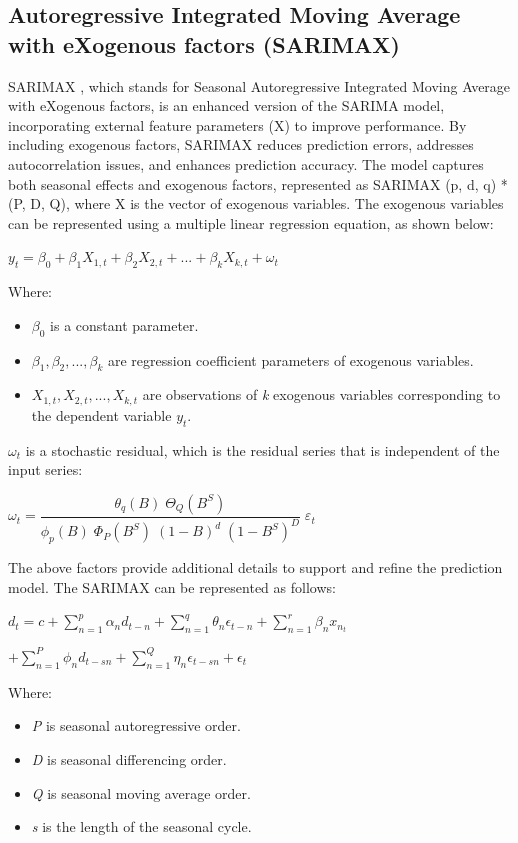 \documentclass{ieeeojies}
\begin{document}
\subsection{Autoregressive Integrated Moving Average with eXogenous factors (SARIMAX)}
SARIMAX \cite{b8}, which stands for Seasonal Autoregressive Integrated Moving Average with eXogenous factors, is an enhanced version of the SARIMA model, incorporating external feature parameters (X) to improve performance. By including exogenous factors, SARIMAX reduces prediction errors, addresses autocorrelation issues, and enhances prediction accuracy. The model captures both seasonal effects and exogenous factors, represented as SARIMAX (p, d, q) * (P, D, Q), where X is the vector of exogenous variables. The exogenous variables can be represented using a multiple linear regression equation, as shown below:
\newline  \centerline{$y_{t} = \beta_{0} + \beta_{1}X_{1,t} + \beta_{2}X_{2,t} + ... + \beta_{k}X_{k,t} + \omega_{t}$}
\newline Where:
\begin{itemize}
	\item $\beta_{0}$ is a constant parameter.
	\item $\beta_{1}, \beta_{2}, ..., \beta_{k}$ are regression coefficient parameters of exogenous variables.
	\item $X_{1,t}, X_{2,t}, ..., X_{k,t}$ are observations
	of \textit{k} exogenous variables corresponding to the dependent variable $y_{t}$.
\end{itemize}
$\omega_{t}$ is a stochastic residual, which is the residual series that is independent of the input series:
\newline  \centerline{$\omega_{t} = \dfrac{\theta_{q}(B) \; \Theta_{Q}(B^{S})}{\phi_{p}(B) \; \Phi_{P}(B^{S}) \; (1-B)^{d} \; (1-B^{S})^{D}} \; \varepsilon_{t}$}
The above factors provide additional details to support and refine the prediction model. The SARIMAX can be represented as follows:
\newline \centerline{$d_{t} = c + \displaystyle \sum_{n=1}^{p}\alpha_{n}d_{t-n} + \displaystyle \sum_{n=1}^{q}\theta_{n}\epsilon_{t-n} + \displaystyle \sum_{n=1}^{r}\beta_{n}x_{n_{t}}$}
\newline \centerline{$+ \displaystyle \sum_{n=1}^{P}\phi_{n}d_{t-sn} + \displaystyle \sum_{n=1}^{Q}\eta_{n}\epsilon_{t-sn} + \epsilon_{t}$}
\newline Where:
\begin{itemize}
	\item \textit{P} is seasonal autoregressive order.
	\item \textit{D} is seasonal differencing order.
	\item \textit{Q} is seasonal moving average order.
	\item \textit{s} is the length of the seasonal cycle.
\end{itemize}
\end{document}

